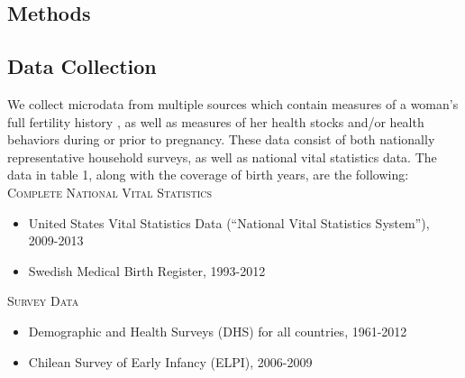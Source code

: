 \documentclass{nature}
\begin{document}
\begin{linenumbers}
\clearpage

\section{Methods}
\subsection{Data Collection}
We collect microdata from multiple sources %
which contain measures of a woman's full fertility history 
, as well as measures of her health stocks and/or health behaviors during or prior to pregnancy.  These data consist of both nationally representative household surveys, as well as national vital statistics data. %
The data in table 1, along with the coverage of birth years, are the following: \vspace{3mm} \\
\textsc{Complete National Vital Statistics} \vspace{-10mm}
\begin{itemize}
\item United States Vital Statistics Data (``National Vital Statistics System''), 2009-2013 \vspace{-4mm}
\item Swedish Medical Birth Register, 1993-2012 \vspace{-8mm}
\end{itemize}
\textsc{Survey Data} \vspace{-10mm}
\begin{itemize}
\item Demographic and Health Surveys (DHS) for all countries, 1961-2012 \vspace{-4mm}
\item Chilean Survey of Early Infancy (ELPI), 2006-2009 \vspace{-4mm}

\end{itemize}
\end{linenumbers}
\end{document}
